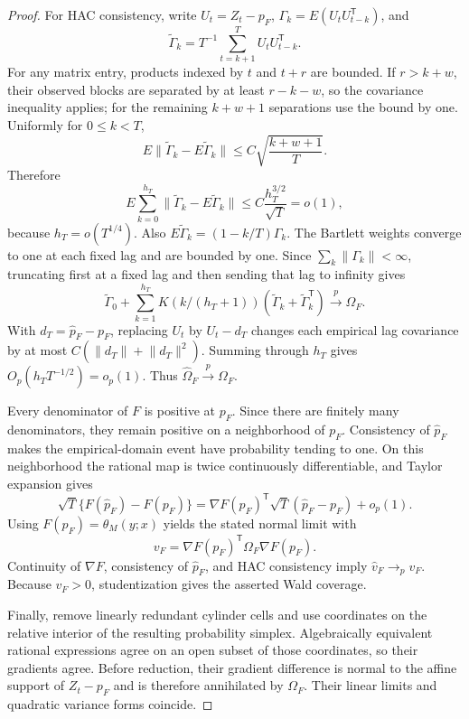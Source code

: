 \documentclass{article}
\begin{document}
\begin{proof}
For HAC consistency, write \(U_t=Z_t-p_F\), \(\Gamma_k=E(U_tU_{t-k}^{\mathsf T})\), and
\[
 \widetilde\Gamma_k=T^{-1}\sum_{t=k+1}^TU_tU_{t-k}^{\mathsf T}.
\]
For any matrix entry, products indexed by \(t\) and \(t+r\) are bounded.  If \(r>k+w\), their observed blocks are separated by at least \(r-k-w\), so the covariance inequality applies; for the remaining \(k+w+1\) separations use the bound by one.  Uniformly for \(0\le k<T\),
\[
 E\lVert\widetilde\Gamma_k-E\widetilde\Gamma_k\rVert
 \le C\sqrt{\frac{k+w+1}{T}}.
\]
Therefore
\[
 E\sum_{k=0}^{h_T}\lVert\widetilde\Gamma_k-E\widetilde\Gamma_k\rVert
 \le C\frac{h_T^{3/2}}{\sqrt T}=o(1),
\]
because \(h_T=o(T^{1/4})\).  Also \(E\widetilde\Gamma_k=(1-k/T)\Gamma_k\).  The Bartlett weights converge to one at each fixed lag and are bounded by one.  Since \(\sum_k\lVert\Gamma_k\rVert<\infty\), truncating first at a fixed lag and then sending that lag to infinity gives
\[
 \widetilde\Gamma_0+
 \sum_{k=1}^{h_T}K(k/(h_T+1))
 (\widetilde\Gamma_k+\widetilde\Gamma_k^{\mathsf T})
 \overset p\longrightarrow\Omega_F.
\]
With \(d_T=\widehat p_F-p_F\), replacing \(U_t\) by \(U_t-d_T\) changes each empirical lag covariance by at most \(C(\lVert d_T\rVert+\lVert d_T\rVert^2)\).  Summing through \(h_T\) gives \(O_p(h_TT^{-1/2})=o_p(1)\).  Thus \(\widehat\Omega_F\overset p\to\Omega_F\).

Every denominator of \(F\) is positive at \(p_F\).  Since there are finitely many denominators, they remain positive on a neighborhood of \(p_F\).  Consistency of \(\widehat p_F\) makes the empirical-domain event have probability tending to one.  On this neighborhood the rational map is twice continuously differentiable, and Taylor expansion gives
\[
 \sqrt T\{F(\widehat p_F)-F(p_F)\}
 =\nabla F(p_F)^{\mathsf T}\sqrt T(\widehat p_F-p_F)+o_p(1).
\]
Using \(F(p_F)=\theta_M(y;x)\) yields the stated normal limit with
\[
 v_F=\nabla F(p_F)^{\mathsf T}\Omega_F\nabla F(p_F).
\]
Continuity of \(\nabla F\), consistency of \(\widehat p_F\), and HAC consistency imply \(\widehat v_F\to_pv_F\).  Because \(v_F>0\), studentization gives the asserted Wald coverage.

Finally, remove linearly redundant cylinder cells and use coordinates on the relative interior of the resulting probability simplex.  Algebraically equivalent rational expressions agree on an open subset of those coordinates, so their gradients agree.  Before reduction, their gradient difference is normal to the affine support of \(Z_t-p_F\) and is therefore annihilated by \(\Omega_F\).  Their linear limits and quadratic variance forms coincide.
\end{proof}
\end{document}
